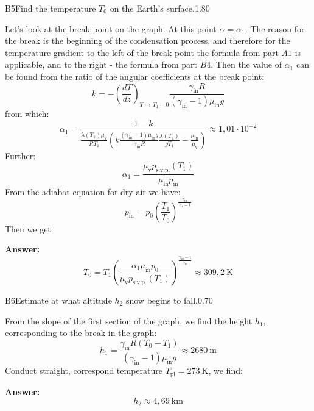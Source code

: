 \documentclass[11pt,a4paper]{article}
\begin{document}
\begin{solcard}{B5}{Find the temperature $T_0$ on the Earth's surface.}{1.80}

Let's look at the break point on the graph. At this point $\alpha=\alpha_1$. The reason for the break is the beginning of the condensation process, and therefore for the temperature gradient to the left of the break point the formula from part $A1$ is applicable, and to the right - the formula from part $B4$. Then the value of $\alpha_1$ can be found from the ratio of the angular coefficients at the break point: $$k=-\displaystyle \left( \frac{dT}{dz} \right)_{T\to T_{1}-0 } \displaystyle\frac{\gamma_\text{in}R}{(\gamma_\text{in}-1)\mu_\text{in}g} $$ from which: $$\alpha_1=\displaystyle\frac{1-k}{\displaystyle\frac{\lambda(T_1)\mu_\text{v}}{RT_1}\left(k\displaystyle\frac{(\gamma_\text{in}-1)\mu_\text{in}g}{\gamma_\text{in} R}\displaystyle\frac{\lambda(T_1)}{gT_1}-\displaystyle\frac{\mu_\text{in}}{\mu_\text{v}}\right)}\approx{1{,}01}\cdot{10^{-2}} $$ Further: $$\alpha_1=\displaystyle\frac{\mu_\text{v}p_\text{s.v.p.}(T_1)}{\mu_\text{in}p_\text{in}} $$ From the adiabat equation for dry air we have: $$p_\text{in}=p_0\left(\displaystyle\frac{T_1}{T_0}\right)^{\frac{\gamma_\text{in}}{\gamma_\text{in}-1}} $$ Then we get:

\par\smallskip\noindent\textbf{Answer:} $$T_0=T_1\left(\displaystyle\frac{\alpha_1\mu_\text{in}p_0}{\mu_\text{v}p_\text{s.v.p.}(T_1)}\right)^{\frac{\gamma_\text{in}-1}{\gamma_\text{in}}}\approx{309{,}2~\text{K}} $$
\end{solcard}

\begin{solcard}{B6}{Estimate at what altitude $h_2$ snow begins to fall.}{0.70}

From the slope of the first section of the graph, we find the height $h_1$, corresponding to the break in the graph: $$h_1=\displaystyle\frac{\gamma_\text{in}R(T_0-T_1)}{(\gamma_\text{in}-1)\mu_\text{in}g}\approx{2680~\text{m}} $$ Conduct straight, correspond temperature $T_\text{pl}=273~\text{K}$, we find:

\par\smallskip\noindent\textbf{Answer:} $$h_2\approx{4{,}69~\text{km}} $$
\end{solcard}
\end{document}
